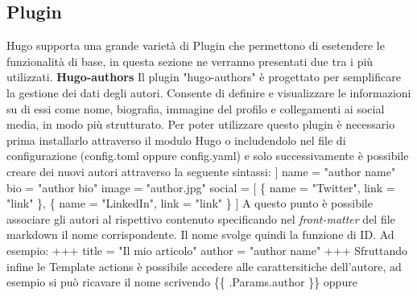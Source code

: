 \documentclass[target=bach,aauheader=]{thud}
\begin{document}
\subsection{Plugin}
Hugo supporta una grande varietà di Plugin che permettono di esetendere le funzionalità di base, in questa sezione ne verranno presentati due tra i più utilizzati.
\newline 
\newline 
\textbf{{\fontsize{12}{14}\selectfont Hugo-authors}}
\newline \newline
Il plugin "hugo-authors" è progettato per semplificare la gestione dei dati degli autori. Consente di definire e visualizzare le informazioni su di essi come nome, biografia, immagine del profilo e collegamenti ai social media, in modo più strutturato.
\newline
Per poter utilizzare questo plugin è necessario prima installarlo attraverso il modulo Hugo o includendolo nel file di configurazione (config.toml oppure config.yaml) e solo successivamente è possibile creare dei nuovi autori attraverso la seguente sintassi:
\newline \newline
[author]
\newline
[[author.authors]]
\newline
name = "author name"
\newline 
bio = "author bio"
\newline 
image = "author.jpg"
\newline
social = [
\newline
\qquad    \{ name = "Twitter", link = "link" \},
\newline
\qquad    \{ name = "LinkedIn", link = "link" \}
\newline
]
\newline \newline
A questo punto è possibile associare gli autori al rispettivo contenuto specificando nel \textit{front-matter} del file markdown il nome corrispondente. Il nome svolge quindi la funzione di ID. Ad esempio:
\newline \newline
+++
\newline title = "Il mio articolo"
\newline author = "author name"
\newline 
+++
\newline \newline
Sfruttando infine le Template actions è possibile accedere alle carattersitiche dell'autore, ad esempio si può ricavare il nome scrivendo \{\{ .Params.author \}\} oppure 
\end{document}
